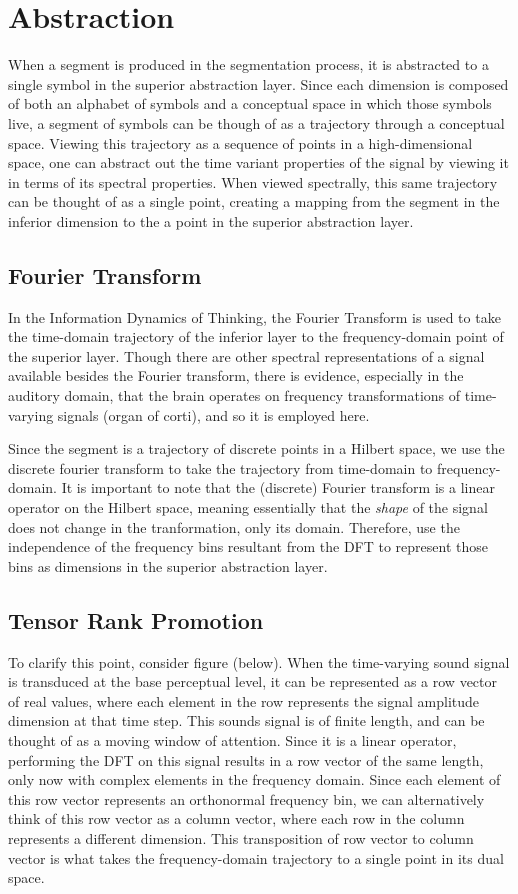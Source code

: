 \chapter{Abstraction}

When a segment is produced in the segmentation process, it is abstracted to a single symbol in the superior abstraction layer.  Since each dimension is composed of both an alphabet of symbols and a conceptual space in which those symbols live, a segment of symbols can be though of as a trajectory through a conceptual space.  Viewing this trajectory as a sequence of points in a high-dimensional space, one can abstract out the time variant properties of the signal by viewing it in terms of its spectral properties.  When viewed spectrally, this same trajectory can be thought of as a single point, creating a mapping from the segment in the inferior dimension to the a point in the superior abstraction layer.

\section{Fourier Transform}
In the Information Dynamics of Thinking, the Fourier Transform is used to take the time-domain trajectory of the inferior layer to the frequency-domain point of the superior layer.  Though there are other spectral representations of a signal available besides the Fourier transform, there is evidence, especially in the auditory domain, that the brain operates on frequency transformations of time-varying signals (organ of corti), and so it is employed here.

Since the segment is a trajectory of discrete points in a Hilbert space, we use the discrete fourier transform to take the trajectory from time-domain to frequency-domain.  It is important to note that the (discrete) Fourier transform is a linear operator on the Hilbert space, meaning essentially that the \textit{shape} of the signal does not change in the tranformation, only its domain.  Therefore, use the independence of the frequency bins resultant from the DFT to represent those bins as dimensions in the superior abstraction layer.

\section{Tensor Rank Promotion}
To clarify this point, consider figure (below).  When the time-varying sound signal is transduced at the base perceptual level, it can be represented as a row vector of real values, where each element in the row represents the signal amplitude dimension at that time step. This sounds signal is of finite length, and can be thought of as a moving window of attention. Since it is a linear operator, performing the DFT on this signal results in a row vector of the same length, only now with complex elements in the frequency domain.  Since each element of this row vector represents an orthonormal frequency bin, we can alternatively think of this row vector as a column vector, where each row in the column represents a different dimension.  This transposition of row vector to column vector is what takes the frequency-domain trajectory to a single point in its dual space.

